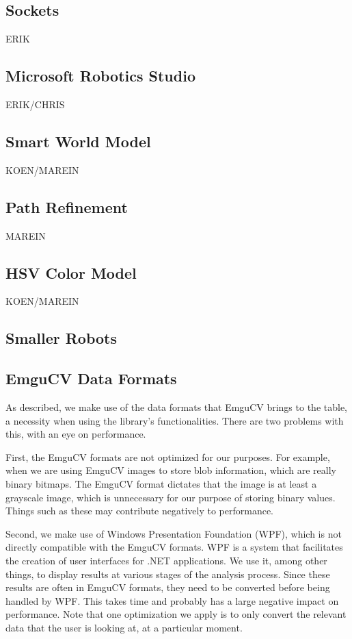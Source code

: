 \documentclass[10pt,twocolumn]{article}
\begin{document}
\subsection{Sockets}
ERIK

\subsection{Microsoft Robotics Studio}
ERIK/CHRIS

\subsection{Smart World Model}
KOEN/MAREIN

\subsection{Path Refinement}
MAREIN

\subsection{HSV Color Model}
KOEN/MAREIN

\subsection{Smaller Robots}

\subsection{EmguCV Data Formats}
As described, we make use of the data formats that EmguCV brings to the table, a necessity when using the library's functionalities. There are two problems with this, with an eye on performance.

First, the EmguCV formats are not optimized for our purposes. For example, when we are using EmguCV images to store blob information, which are really binary bitmaps. The EmguCV format dictates that the image is at least a grayscale image, which is unnecessary for our purpose of storing binary values. Things such as these may contribute negatively to performance.

Second, we make use of Windows Presentation Foundation (WPF), which is not directly compatible with the EmguCV formats. WPF is a system that facilitates the creation of user interfaces for .NET applications. We use it, among other things, to display results at various stages of the analysis process. Since these results are often in EmguCV formats, they need to be converted before being handled by WPF. This takes time and probably has a large negative impact on performance. Note that one optimization we apply is to only convert the relevant data that the user is looking at, at a particular moment.
\end{document}

